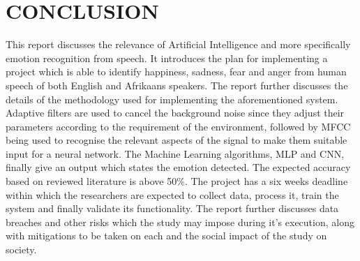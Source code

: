 \documentclass[10pt,twocolumn]{witseiepaper}
\begin{document}
\section{CONCLUSION}\label{sec:conc}
This report discusses the relevance of Artificial Intelligence and more specifically emotion recognition from speech. It introduces the plan for implementing a project which is able to identify happiness, sadness, fear and anger from human speech of both English and Afrikaans speakers. The report further discusses the details of the methodology used for implementing the aforementioned system. Adaptive filters are used to cancel the background noise since they adjust their parameters according to the requirement of the environment, followed by MFCC being used to recognise the relevant aspects of the signal to make them suitable input for a neural network. The Machine Learning algorithms, MLP and CNN, finally give an output which states the emotion detected. The expected accuracy based on reviewed literature is above 50\%. The project has a six weeks deadline within which the researchers are expected to collect data, process it, train the system and finally validate its functionality. The report further discusses data breaches and other risks which the study may impose during it's execution, along with mitigations to be taken on each and the social impact of the study on society.
\end{document}
